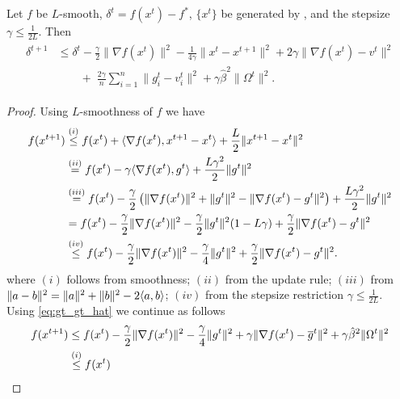 \documentclass[a4paper,11pt]{article}
\begin{document}
\begin{lemma}\label{lem:descent_deltat} Let $f$ be $L$-smooth, $\delta^t = f(x^t) - f^*$, $\{x^t\}$ be generated by , and the stepsize $\gamma\le \frac{1}{2L}$. Then
\begin{align}
\begin{aligned}
    \delta^{t+1} &\le \delta^t  
         - \frac{\gamma}{2}\|\nabla f(x^t)\|^2 
         - \frac{1}{4\gamma}\|x^t-x^{t+1}\|^2
         + 2\gamma\|\nabla f(x^t) -v^t\|^2\\
         &\qquad +\; \frac{2\gamma}{n}\sum_{i=1}^n\|g_i^t - v^t_i\|^2
         + \gamma\hat{\beta}^2\|\Omega^t\|^2.
\end{aligned}
\end{align}
\end{lemma}
\begin{proof}
    Using $L$-smoothness of $f$ we have
     \begin{align}
         f(x^{t+1}) &\overset{(i)}{\le}f(x^t) 
         + \<\nabla f(x^t), x^{t+1} - x^t>
         + \frac{L}{2}\|x^{t+1} - x^t\|^2\notag \\
         &\overset{(ii)}{=} f(x^t) 
         -\gamma \<\nabla f(x^t), g^t>
         + \frac{L\gamma^2}{2}\|g^t\|^2\notag \\
         &\overset{(iii)}{=} f(x^t) 
         - \frac{\gamma}{2}\left(\|\nabla f(x^t)\|^2 + \|g^t\|^2 - \|\nabla f(x^t) - g^t\|^2\right)
         + \frac{L\gamma^2}{2}\|g^t\|^2\notag\\
         &= f(x^t) 
         - \frac{\gamma}{2}\|\nabla f(x^t)\|^2 
         - \frac{\gamma}{2}\|g^t\|^2(1-L\gamma)
         + \frac{\gamma}{2}\|\nabla f(x^t) - g^t\|^2\notag\\
         &\overset{(iv)}{\le} f(x^t)  
         - \frac{\gamma}{2}\|\nabla f(x^t)\|^2 
         - \frac{\gamma}{4}\|g^t\|^2
         + \frac{\gamma}{2}\|\nabla f(x^t) - g^t\|^2.
         \label{eq:pjklnqwdllnk}
     \end{align}
     where $(i)$ follows from smoothness; $(ii)$ from the update rule; $(iii)$ from $\|a-b\|^2 = \|a\|^2 + \|b\|^2 - 2\<a,b>$; $(iv)$ from the stepsize restriction $\gamma \le \frac{1}{2L}$. Using \eqref{eq:gt_gt_hat} we continue as follows 
     \begin{align}
         f(x^{t+1}) &\le f(x^t) 
         - \frac{\gamma}{2}\|\nabla f(x^t)\|^2 
         - \frac{\gamma}{4}\|g^t\|^2
         + \gamma\|\nabla f(x^t) - \overline{g}^t\|^2
         + \gamma\hat{\beta}^2\|\Omega^t\|^2\notag\\
         &\overset{(i)}{\le} f(x^t) 

\end{align}
\end{proof}
\end{document}
